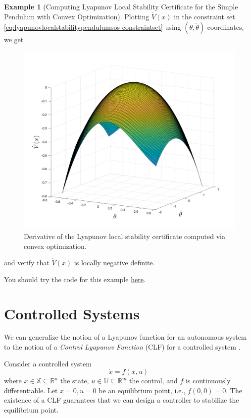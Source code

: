 \documentclass[
]{book}
\theoremstyle{definition}
\theoremstyle{definition}
\newtheorem{example}{Example}[chapter]
\theoremstyle{definition}
\theoremstyle{definition}
\theoremstyle{remark}
\begin{document}
\begin{example}[Computing Lyapunov Local Stability Certificate for the Simple Pendulum with Convex Optimization]
Plotting \(\dot{V}(x)\) in the constraint set \eqref{eq:lyapunovlocalstabilitypendulumsos-constraintset} using \((\theta, \dot{\theta})\) coordinates, we get

\begin{figure}

{\centering \includegraphics[width=0.6\linewidth]{images/pendulum-local-lyapunov-certificate-Vdot} 

}

\caption{Derivative of the Lyapunov local stability certificate computed via convex optimization.}\label{fig:lyapunov-local-certificate-pendulum-Vdot}
\end{figure}

and verify that \(\dot{V}(x)\) is locally negative definite.

You should try the code for this example \href{https://github.com/ComputationalRobotics/OptimalControlEstimation-Examples/blob/main/pendulum_local_lyapunov_certificate.m}{here}.
\end{example}

\hypertarget{controlled-systems}{%
\section{Controlled Systems}\label{controlled-systems}}

We can generalize the notion of a Lyapunov function for an autonomous system to the notion of a \emph{Control Lyapunov Function} (CLF) for a controlled system \citep{sontag83sicopt-clf}.

Consider a controlled system
\begin{equation}
\dot{x} = f(x,u)
\label{eq:clf-controlled-system}
\end{equation}
where \(x \in \mathbb{X} \subseteq \mathbb{R}^n\) the state, \(u \in \mathbb{U} \subseteq \mathbb{R}^m\) the control, and \(f\) is continuously differentiable. Let \(x = 0, u=0\) be an equilibrium point, i.e., \(f(0,0) = 0\). The existence of a CLF guarantees that we can design a controller to stabilize the equilibrium point.
\end{document}
